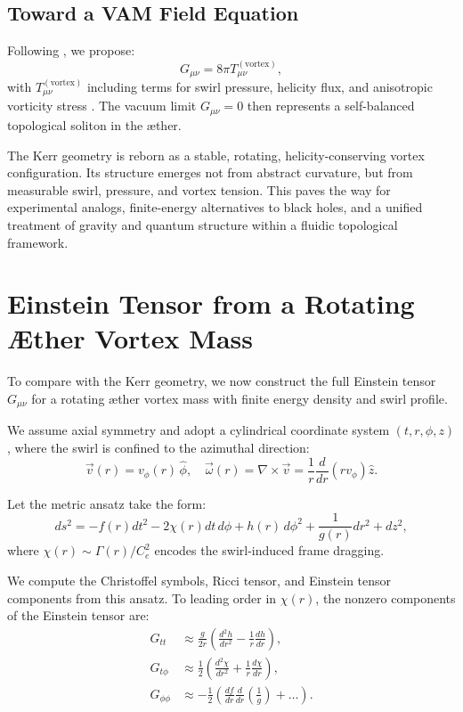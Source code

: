 \documentclass[twocolumn,aps,pre,floatfix,nofootinbib]{revtex4-2}
\begin{document}
\subsection{Toward a VAM Field Equation}
    Following \cite{VAM-2}, we propose:
    \begin{equation}
    G_{\mu\nu} = 8\pi T_{\mu\nu}^{(\text{vortex})},
    \end{equation}
    with $T_{\mu\nu}^{(\text{vortex})}$ including terms for swirl pressure, helicity flux, and anisotropic vorticity stress \cite{VAM-5}. The vacuum limit $G_{\mu\nu} = 0$ then represents a self-balanced topological soliton in the æther.

    The Kerr geometry is reborn as a stable, rotating, helicity-conserving vortex configuration. Its structure emerges not from abstract curvature, but from measurable swirl, pressure, and vortex tension. This paves the way for experimental analogs, finite-energy alternatives to black holes, and a unified treatment of gravity and quantum structure within a fluidic topological framework.





\section{Einstein Tensor from a Rotating Æther Vortex Mass}

    To compare with the Kerr geometry, we now construct the full Einstein tensor \( G_{\mu\nu} \) for a rotating æther vortex mass with finite energy density and swirl profile.

    We assume axial symmetry and adopt a cylindrical coordinate system \( (t, r, \phi, z) \), where the swirl is confined to the azimuthal direction:
    \[
        \vec{v}(r) = v_\phi(r)\, \hat{\phi}, \quad \vec{\omega}(r) = \nabla \times \vec{v} = \frac{1}{r} \frac{d}{dr} (r v_\phi) \hat{z}.
    \]

    Let the metric ansatz take the form:
    \[
        ds^2 = -f(r) dt^2 - 2\chi(r) dt\, d\phi + h(r)\, d\phi^2 + \frac{1}{g(r)} dr^2 + dz^2,
    \]
    where \( \chi(r) \sim \Gamma(r)/C_e^2 \) encodes the swirl-induced frame dragging.

    We compute the Christoffel symbols, Ricci tensor, and Einstein tensor components from this ansatz. To leading order in \( \chi(r) \), the nonzero components of the Einstein tensor are:
    \begin{align}
        G_{tt} &\approx \frac{g}{2r} \left( \frac{d^2 h}{dr^2} - \frac{1}{r} \frac{dh}{dr} \right), \\
        G_{t\phi} &\approx \frac{1}{2} \left( \frac{d^2 \chi}{dr^2} + \frac{1}{r} \frac{d\chi}{dr} \right), \\
        G_{\phi\phi} &\approx -\frac{1}{2} \left( \frac{df}{dr} \frac{d}{dr} \left( \frac{1}{g} \right) + \ldots \right).
    \end{align}
\end{document}

